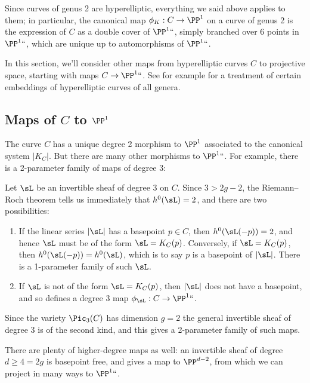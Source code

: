 Since  curves of genus 2 are hyperelliptic, everything we said above
applies to them; in particular, the canonical map $\phi_K : C \to \PP^1$
on a
curve of genus 2
%
 is the expression of $C$ as a double cover of
$\PP^1` `$, simply branched over 6 points in~$\PP^1` `$, which are unique up
to automorphisms of $\PP^1` `$.

In this section, we'll consider other maps from hyperelliptic curves $C$
to projective space, starting with maps $C \to \PP^1` `$.
See for example \cite{transcanonical} for a treatment of certain
embeddings of hyperelliptic curves of all genera.

\subsection*{Maps of $C$ to $\PP^1$}

The curve $C$ has a unique degree 2 morphism to $\PP^1$  associated
to the canonical system $|K_C|$. But there are many other morphisms to
$\PP^1` `$. For example, there is a 2-parameter
family of maps of degree 3:

 Let $\sL$ be an invertible sheaf of degree 3 on $C$. Since $3 > 2g-2$,
 the
Riemann--Roch theorem
%
 tells us immediately that $h^0(\sL) = 2$, and
 there are two possibilities:

\begin{enumerate}
\item If the linear series $|\sL|$ has a basepoint $p \in C$,
then $h^0(\sL(-p)) = 2$, and hence $\sL$ must be of the form $\sL =
K_C(p)$. Conversely, if $\sL = K_C(p)$, then $h^0(\sL(-p)) = h^0(\sL)$, which
is to say $p$ is a basepoint of $|\sL|$. There is a 1-parameter family of
such $\sL$.

\item If $\sL$ is not of the form $\sL = K_C(p)$, then $|\sL|$ does not have
\label{genus 2 pencil} %
a basepoint, and so defines a degree 3 map $\phi_\sL : C \to \PP^1` `$.
\end{enumerate}

Since the variety $\Pic_3(C)$ has dimension $g= 2$ the general invertible
sheaf of degree 3 is of the second kind, and this gives a 2-parameter
family of such maps.

There are plenty of higher-degree maps as well: an invertible sheaf of
degree $d \geq 4 = 2g$ is basepoint free, and gives a map to $\PP^{d-2}$,
from which we can project in many ways
to $\PP^1` `$.

